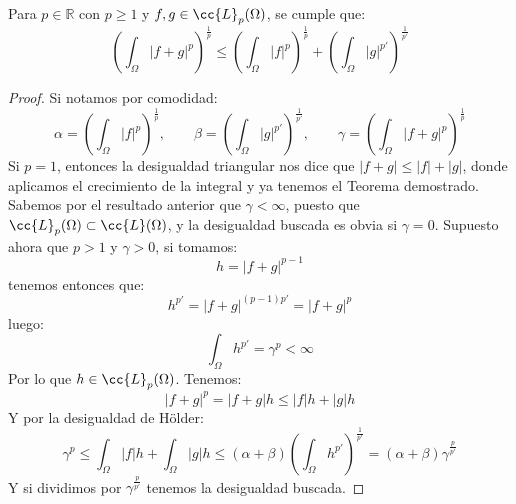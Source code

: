 \begin{teo}
    Para $p\in \mathbb{R}$ con $p\geq 1$ y $f,g\in \cc{L}_p(\Omega)$, se cumple que:
    \begin{equation*}
        {\left(\int_\Omega |f+g|^p\right)}^{\frac{1}{p}} \leq {\left(\int_\Omega |f|^p\right)}^{\frac{1}{p}} + {\left(\int_\Omega |g|^{p'}\right)}^{\frac{1}{p'}}
    \end{equation*}
    \begin{proof}
        Si notamos por comodidad:
        \begin{equation*}
            \alpha = {\left(\int_\Omega |f|^p\right)}^{\frac{1}{p}},  \qquad \beta ={\left(\int_\Omega |g|^{p'}\right)}^{\frac{1}{p'}}, \qquad \gamma = {\left(\int_\Omega |f+g|^p\right)}^{\frac{1}{p}} 
        \end{equation*}
        Si $p=1$, entonces la desigualdad triangular nos dice que $|f+g| \leq |f| + |g|$, donde aplicamos el crecimiento de la integral y ya tenemos el Teorema demostrado. Sabemos por el resultado anterior que $\gamma<\infty$, puesto que $\cc{L}_p(\Omega)\subset \cc{L}(\Omega)$, y la desigualdad buscada es obvia si $\gamma = 0$.  Supuesto ahora que $p>1$ y $\gamma>0$, si tomamos:
        \begin{equation*}
            h = |f+g|^{p-1}
        \end{equation*}
        tenemos entonces que:
        \begin{equation*}
            h^{p'} = |f+g|^{(p-1)p'} = |f+g|^p
        \end{equation*}
        luego:
        \begin{equation*}
            \int_\Omega h^{p'} = \gamma^p < \infty
        \end{equation*}
        Por lo que $h\in \cc{L}_p(\Omega)$. Tenemos:
        \begin{equation*}
            |f+g|^p = |f+g|h \leq |f| h + |g| h
        \end{equation*}
        Y por la desigualdad de Hölder:
        \begin{equation*}
            \gamma^p \leq \int_\Omega |f| h + \int_\Omega |g|h \leq (\alpha+\beta){\left(\int_\Omega h^{p'}\right)}^{\frac{1}{p'}} = (\alpha + \beta)\gamma^{\frac{p}{p'}}
        \end{equation*}
        Y si dividimos por $\gamma^{\frac{p}{p'}}$ tenemos la desigualdad buscada.
    \end{proof}
\end{teo}

